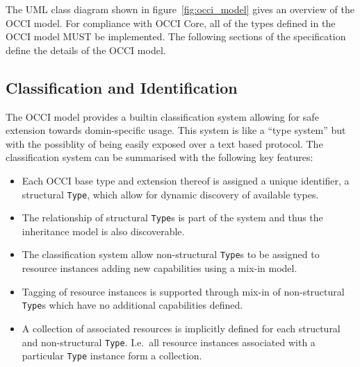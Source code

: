 \documentclass[10pt,a4paper,british]{article}
\newcommand{\hl}{\texttt}
\begin{document}
The UML class diagram shown in figure~\ref{fig:occi_model} gives an overview of
the OCCI model.  For compliance with OCCI Core, all of the types defined in
the OCCI model MUST be implemented.
The following sections of the specification define the details of the OCCI
model.

\subsection{Classification and Identification}

The OCCI model provides a builtin classification system allowing for safe
extension towards domin-specific usage. This system is like a ``type system''
but with the possiblity of being easily exposed over a text based protocol.
%
The classification system can be summarised with the following key features:
\begin{itemize}
\item Each OCCI base type and extension thereof is assigned a unique
 identifier, a structural \hl{Type}, which allow for dynamic discovery of available
 types.
\item The relationship of structural \hl{Type}s is part of the system and thus
 the inheritance model is also discoverable.
\item The classification system allow non-structural \hl{Type}s to be assigned
 to resource instances adding new capabilities using a mix-in model.
\item Tagging of resource instances is supported through mix-in of
 non-structural \hl{Type}s which have no additional capabilities defined.
\item A collection of associated resources is implicitly defined for each
 structural and non-structural \hl{Type}. I.e.~all resource instances
 associated with a particular \hl{Type} instance form a collection.
\end{itemize}

\end{document}
